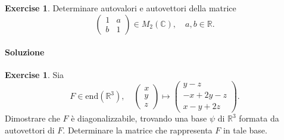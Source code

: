 \documentclass{article}
\theoremstyle{plain}
\theoremstyle{definition}
\newtheorem{xca}[exmp]{Exercise}
\theoremstyle{remark}
\begin{document}
\vspace{10pt}

\begin{bxthm}
\begin{xca}
    Determinare autovalori e autovettori della matrice
    \[\begin{pmatrix}1&a\\b&1\end{pmatrix}\in M_2(\mathbb{C}),\quad a,b\in\mathbb{R}.\]
\end{xca}
\end{bxthm}
\paragraph{Soluzione}

\vspace{10pt}

\begin{bxthm}
\begin{xca}
    Sia 
    \[F\in\mathrm{end}(\mathbb{R}^3),\quad \begin{pmatrix}x\\y\\z\end{pmatrix}\mapsto \begin{pmatrix}y-z\\-x+2y-z\\x-y+2z\end{pmatrix}.\]
    Dimostrare che $F$ è diagonalizzabile, trovando una base $\psi$ di $\mathbb{R}^3$ formata da autovettori di $F$. Determinare la matrice che rappresenta $F$ in tale base.
\end{xca}
\end{bxthm}
\end{document}
